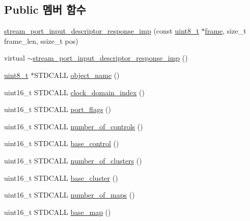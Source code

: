 \subsection*{Public 멤버 함수}
\begin{DoxyCompactItemize}
\item 
\hyperlink{classavdecc__lib_1_1stream__port__input__descriptor__response__imp_ab97058f390d6157bdfdb0ae838cf02d0}{stream\+\_\+port\+\_\+input\+\_\+descriptor\+\_\+response\+\_\+imp} (const \hyperlink{stdint_8h_aba7bc1797add20fe3efdf37ced1182c5}{uint8\+\_\+t} $\ast$\hyperlink{gst__avb__playbin_8c_ac8e710e0b5e994c0545d75d69868c6f0}{frame}, size\+\_\+t frame\+\_\+len, ssize\+\_\+t pos)
\item 
virtual \hyperlink{classavdecc__lib_1_1stream__port__input__descriptor__response__imp_a962705832fd2069390d5d35062d5af17}{$\sim$stream\+\_\+port\+\_\+input\+\_\+descriptor\+\_\+response\+\_\+imp} ()
\item 
\hyperlink{stdint_8h_aba7bc1797add20fe3efdf37ced1182c5}{uint8\+\_\+t} $\ast$S\+T\+D\+C\+A\+LL \hyperlink{classavdecc__lib_1_1stream__port__input__descriptor__response__imp_a15837e3eb254ad44812cb766ae8cd53c}{object\+\_\+name} ()
\item 
uint16\+\_\+t S\+T\+D\+C\+A\+LL \hyperlink{classavdecc__lib_1_1stream__port__input__descriptor__response__imp_a25f4f17a510b3f05e97806cd40751774}{clock\+\_\+domain\+\_\+index} ()
\item 
uint16\+\_\+t S\+T\+D\+C\+A\+LL \hyperlink{classavdecc__lib_1_1stream__port__input__descriptor__response__imp_ae5cbe71db539f040ce51a399c2ba66c5}{port\+\_\+flags} ()
\item 
uint16\+\_\+t S\+T\+D\+C\+A\+LL \hyperlink{classavdecc__lib_1_1stream__port__input__descriptor__response__imp_abdf54b1d2b03f5f2b7346ddc9d93df5c}{number\+\_\+of\+\_\+controls} ()
\item 
uint16\+\_\+t S\+T\+D\+C\+A\+LL \hyperlink{classavdecc__lib_1_1stream__port__input__descriptor__response__imp_a81a06cae8ad2431f6a3e067cc210aa98}{base\+\_\+control} ()
\item 
uint16\+\_\+t S\+T\+D\+C\+A\+LL \hyperlink{classavdecc__lib_1_1stream__port__input__descriptor__response__imp_a3d7106b0835bc6a75c4ff27011c9666e}{number\+\_\+of\+\_\+clusters} ()
\item 
uint16\+\_\+t S\+T\+D\+C\+A\+LL \hyperlink{classavdecc__lib_1_1stream__port__input__descriptor__response__imp_a03b85cb427681a1de77dbfacda75f39a}{base\+\_\+cluster} ()
\item 
uint16\+\_\+t S\+T\+D\+C\+A\+LL \hyperlink{classavdecc__lib_1_1stream__port__input__descriptor__response__imp_a05d30e1a63b1459efaacfc203df1c9d7}{number\+\_\+of\+\_\+maps} ()
\item 
uint16\+\_\+t S\+T\+D\+C\+A\+LL \hyperlink{classavdecc__lib_1_1stream__port__input__descriptor__response__imp_abd6f9fab6c33d076df43b45ccd40d589}{base\+\_\+map} ()
\end{DoxyCompactItemize}
